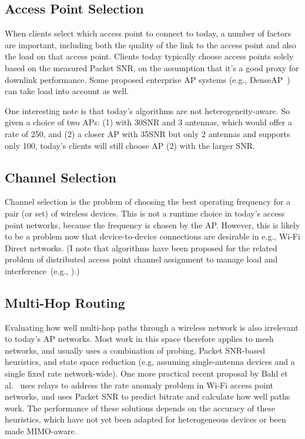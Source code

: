 \subsection{Access Point Selection}
When clients select which access point to connect to today, a number of factors are important, including both the quality of the link to the access point and also the load on that access point. Clients today typically choose access points solely based on the measured Packet SNR, on the assumption that it's a good proxy for downlink performance. Some proposed enterprise AP systems (e.g., DenseAP~\cite{Murty_DenseAP}) can take load into account as well.

One interesting note is that today's algorithms are not heterogeneity-aware. So given a choice of two APs: (1) with 30\dB SNR and 3 antennas, which would offer a rate of 250\Mbps, and (2) a closer AP with 35\dB SNR but only 2 antennas and supports only 100\Mbps, today's clients will still choose AP (2) with the larger SNR.

\subsection{Channel Selection}
Channel selection is the problem of choosing the best operating frequency for a pair (or set) of wireless devices. This is not a runtime choice in today's access point networks, because the frequency is chosen by the AP. However, this is likely to be a problem now that device-to-device connections are desirable in e.g., Wi-Fi Direct networks. (I note that algorithms have been proposed for the related problem of distributed access point channel assignment to manage load and interference~(e.g., \cite{Akella_Chan}).)

\subsection{Multi-Hop Routing}
Evaluating how well multi-hop paths through a wireless network is also irrelevant to today's AP networks. Most work in this space therefore applies to mesh networks, and usually uses a combination of probing, Packet SNR-based heuristics, and state space reduction (e.g, assuming single-antenna devices and a single fixed rate network-wide). One more practical recent proposal by Bahl et al.~\cite{Bahl_repeater} uses relays to address the rate anomaly problem in Wi-Fi access point networks, and uses Packet SNR to predict bitrate and calculate how well paths work. The performance of these solutions depends on the accuracy of these heuristics, which have not yet been adapted for heterogeneous devices or been made MIMO-aware.

